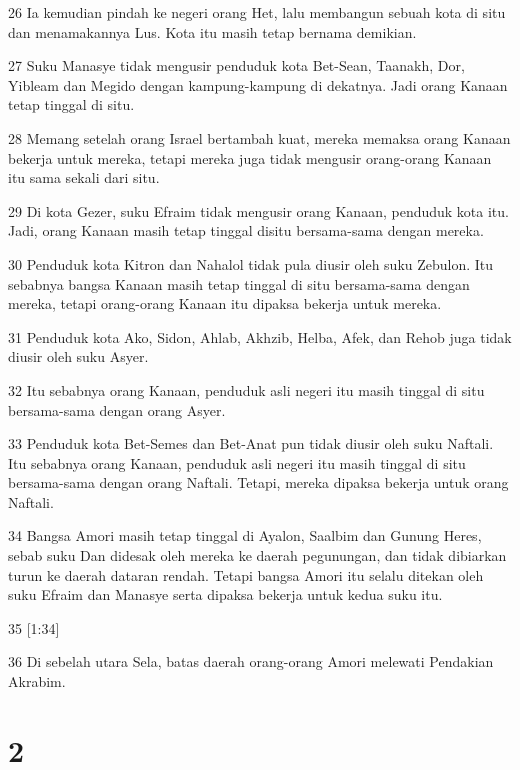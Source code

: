 \par 26 Ia kemudian pindah ke negeri orang Het, lalu membangun sebuah kota di situ dan menamakannya Lus. Kota itu masih tetap bernama demikian.
\par 27 Suku Manasye tidak mengusir penduduk kota Bet-Sean, Taanakh, Dor, Yibleam dan Megido dengan kampung-kampung di dekatnya. Jadi orang Kanaan tetap tinggal di situ.
\par 28 Memang setelah orang Israel bertambah kuat, mereka memaksa orang Kanaan bekerja untuk mereka, tetapi mereka juga tidak mengusir orang-orang Kanaan itu sama sekali dari situ.
\par 29 Di kota Gezer, suku Efraim tidak mengusir orang Kanaan, penduduk kota itu. Jadi, orang Kanaan masih tetap tinggal disitu bersama-sama dengan mereka.
\par 30 Penduduk kota Kitron dan Nahalol tidak pula diusir oleh suku Zebulon. Itu sebabnya bangsa Kanaan masih tetap tinggal di situ bersama-sama dengan mereka, tetapi orang-orang Kanaan itu dipaksa bekerja untuk mereka.
\par 31 Penduduk kota Ako, Sidon, Ahlab, Akhzib, Helba, Afek, dan Rehob juga tidak diusir oleh suku Asyer.
\par 32 Itu sebabnya orang Kanaan, penduduk asli negeri itu masih tinggal di situ bersama-sama dengan orang Asyer.
\par 33 Penduduk kota Bet-Semes dan Bet-Anat pun tidak diusir oleh suku Naftali. Itu sebabnya orang Kanaan, penduduk asli negeri itu masih tinggal di situ bersama-sama dengan orang Naftali. Tetapi, mereka dipaksa bekerja untuk orang Naftali.
\par 34 Bangsa Amori masih tetap tinggal di Ayalon, Saalbim dan Gunung Heres, sebab suku Dan didesak oleh mereka ke daerah pegunungan, dan tidak dibiarkan turun ke daerah dataran rendah. Tetapi bangsa Amori itu selalu ditekan oleh suku Efraim dan Manasye serta dipaksa bekerja untuk kedua suku itu.
\par 35 [1:34]
\par 36 Di sebelah utara Sela, batas daerah orang-orang Amori melewati Pendakian Akrabim.

\chapter{2}

